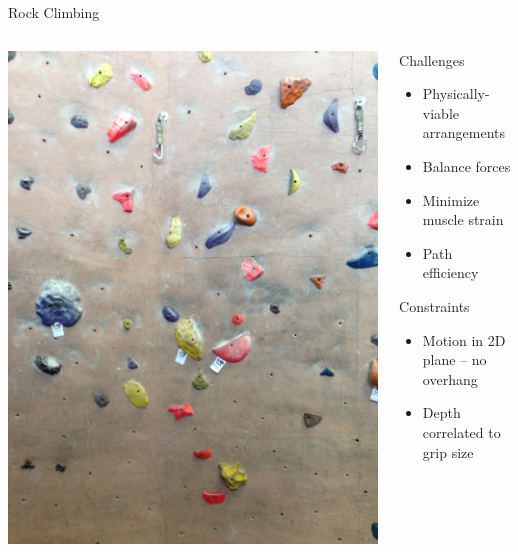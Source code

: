 \documentclass{beamer}
\begin{document}
\begin{frame}{Rock Climbing}
\begin{columns}

\begin{column}[T]{.5\linewidth}
\includegraphics[height=\linewidth,angle=-90]{img/test2.JPG}
\end{column}
\begin{column}[T]{.6\linewidth}
\vspace{.8cm}
Challenges
\pause
\begin{itemize}
 \item Physically-viable arrangements
 \item Balance forces
 \item Minimize muscle strain
 \item Path efficiency
\end{itemize}
\pause
\vspace{.3cm}
Constraints
\begin{itemize}
 \item Motion in 2D plane -- no overhang
 \item Depth correlated to grip size
\end{itemize}
\end{column}

\end{columns}
\end{frame}
\end{document}
